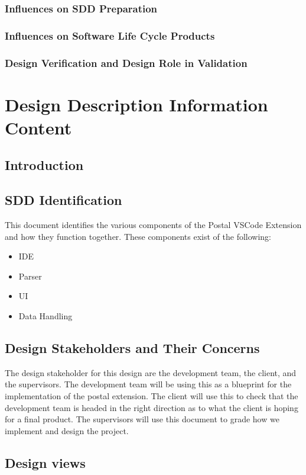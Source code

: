 \documentclass[letterpaper,10pt,titlepage,draftclsnofoot,onecolumn,onesided] {IEEEtran}
\begin{document}
\subsubsection{Influences on SDD Preparation}
\subsubsection{Influences on Software Life Cycle Products}
\subsubsection{Design Verification and Design Role in Validation}

\section{Design Description Information Content}

\subsection{Introduction}

\subsection{SDD Identification}
This document identifies the various components of the Postal VSCode Extension and how they function together. These components exist of the following:
\begin{itemize}
\item IDE
\item Parser
\item UI
\item Data Handling
\end{itemize}

\subsection{Design Stakeholders and Their Concerns}
The design stakeholder for this design are the development team, the client, and the supervisors.
The development team will be using this as a blueprint for the implementation of the postal extension. 
The client will use this to check that the development team is headed in the right direction as to what the client is hoping for a final product.
The supervisors will use this document to grade how we implement and design the project.

\subsection{Design views}
\end{document}
